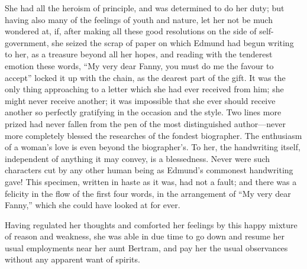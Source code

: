 She had all the heroism of principle, and was determined
to do her duty; but having also many of the feelings of youth
and nature, let her not be much wondered at, if, after making
all these good resolutions on the side of self-government,
she seized the scrap of paper on which Edmund had begun
writing to her, as a treasure beyond all her hopes,
and reading with the tenderest emotion these words,
``My very dear Fanny, you must do me the favour to accept''
locked it up with the chain, as the dearest part of the gift.
It was the only thing approaching to a letter which she
had ever received from him; she might never receive another;
it was impossible that she ever should receive another
so perfectly gratifying in the occasion and the style.
Two lines more prized had never fallen from the pen
of the most distinguished author---never more completely
blessed the researches of the fondest biographer.
The enthusiasm of a woman's love is even beyond
the biographer's. To her, the handwriting itself,
independent of anything it may convey, is a blessedness.
Never were such characters cut by any other human being
as Edmund's commonest handwriting gave!  This specimen,
written in haste as it was, had not a fault; and there
was a felicity in the flow of the first four words,
in the arrangement of ``My very dear Fanny,'' which she
could have looked at for ever.

Having regulated her thoughts and comforted her feelings
by this happy mixture of reason and weakness, she was able
in due time to go down and resume her usual employments
near her aunt Bertram, and pay her the usual observances
without any apparent want of spirits.

